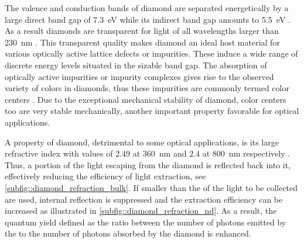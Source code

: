   The valence and conduction bands of diamond are separated energetically by a large direct band gap of \SI{7.3}{\eV} while its indirect band gap amounts to \SI{5.5}{\eV} \cite{Clark1964, Saslow1966}. As a result diamonds are transparent for light of all wavelengths larger than \SI{230}{\nm} \cite{Mildren2008}. This transparent quality makes diamond an ideal host material for various optically active lattice defects or impurities. These induce a wide range of discrete energy levels situated in the sizable band gap. The absorption of optically active impurities or impurity complexes gives rise to the observed variety of colors in diamonds, thus these impurities are commonly termed color centers \cite{neu2012}. Due to the exceptional mechanical stability of diamond, color centers too are very stable mechanically, another important property favorable for optical applications.

  A property of diamond, detrimental to some optical applications, is its large refractive index with values of $2.49$ at \SI{360}{\nm} and $2.4$ at \SI{800}{\nm} respectively \cite{Zaitsev2001}. Thus, a portion of the light escaping from the diamond is reflected back into it, effectively reducing the efficiency of light extraction, see \autoref{subfig::diamond_refraction_bulk}. If \nds smaller than the \wl of the light to be collected are used, internal reflection is suppressed and the extraction efficiency can be increased \cite{Beveratos2001} as illustrated in \autoref{subfig::diamond_refraction_nd}. As a result, the quantum yield defined as the ratio between the number of photons emitted by the \siv to the number of photons absorbed by the diamond is enhanced.

